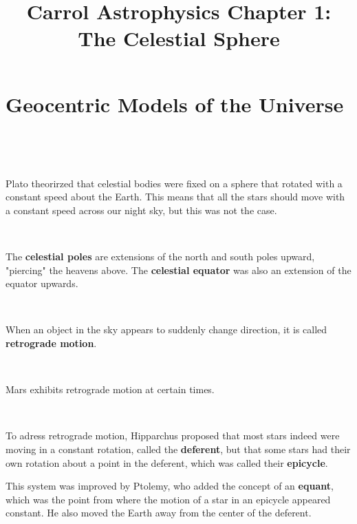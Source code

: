 \documentclass{article}
\title{Carrol Astrophysics Chapter 1: The Celestial Sphere}
\begin{document}
\maketitle

\section{Geocentric Models of the Universe}
\

\begin{example}
\

Plato theorirzed that celestial bodies were fixed on a sphere that rotated with a constant speed about the Earth. This means that all the stars should move with a constant speed across our night sky, but this was not the case.
\end{example}

\begin{definition}
\

The \textbf{celestial poles} are extensions of the north and south poles upward, "piercing" the heavens above. The \textbf{celestial equator} was also an extension of the equator upwards.    
\end{definition}

\begin{definition}
\

When an object in the sky appears to suddenly change direction, it is called \textbf{retrograde motion}. 
\end{definition}

\begin{example}
\

Mars exhibits retrograde motion at certain times.
\end{example}

\begin{example}
\

To adress retrograde motion, Hipparchus proposed that most stars indeed were moving in a constant rotation, called the \textbf{deferent}, but that some stars had their own rotation about a point in the deferent, which was called their \textbf{epicycle}. 

This system was improved by Ptolemy, who added the concept of an \textbf{equant}, which was the point from where the motion of a star in an epicycle appeared constant. He also moved the Earth away from the center of the deferent.
\end{example}
\end{document}
